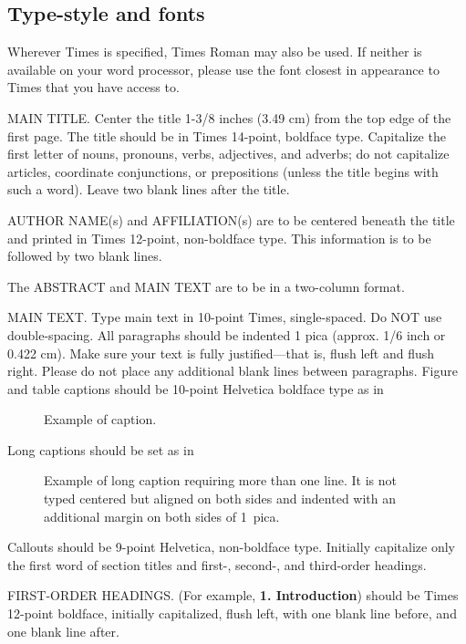 \documentclass[10pt,twocolumn]{IEEEtran}
\begin{document}
\subsection{Type-style and fonts}

Wherever Times is specified, Times Roman may also be used. If neither is
available on your word processor, please use the font closest in
appearance to Times that you have access to.

MAIN TITLE. Center the title 1-3/8 inches (3.49 cm) from the top edge of
the first page. The title should be in Times 14-point, boldface type.
Capitalize the first letter of nouns, pronouns, verbs, adjectives, and
adverbs; do not capitalize articles, coordinate conjunctions, or
prepositions (unless the title begins with such a word). Leave two blank
lines after the title.

AUTHOR NAME(s) and AFFILIATION(s) are to be centered beneath the title
and printed in Times 12-point, non-boldface type. This information is to
be followed by two blank lines.

The ABSTRACT and MAIN TEXT are to be in a two-column format.

MAIN TEXT. Type main text in 10-point Times, single-spaced. Do NOT use
double-spacing. All paragraphs should be indented 1 pica (approx. 1/6
inch or 0.422 cm). Make sure your text is fully justified---that is,
flush left and flush right. Please do not place any additional blank
lines between paragraphs. Figure and table captions should be 10-point
Helvetica boldface type as in
\begin{figure}[H]
   \caption{Example of caption.}
\end{figure}

\noindent Long captions should be set as in
\begin{figure}[H]
   \caption{Example of long caption requiring more than one line. It is
     not typed centered but aligned on both sides and indented with an
     additional margin on both sides of 1~pica.}
\end{figure}

\noindent Callouts should be 9-point Helvetica, non-boldface type.
Initially capitalize only the first word of section titles and first-,
second-, and third-order headings.

FIRST-ORDER HEADINGS. (For example, {\large \bf 1. Introduction})
should be Times 12-point boldface, initially capitalized, flush left,
with one blank line before, and one blank line after.
\end{document}

